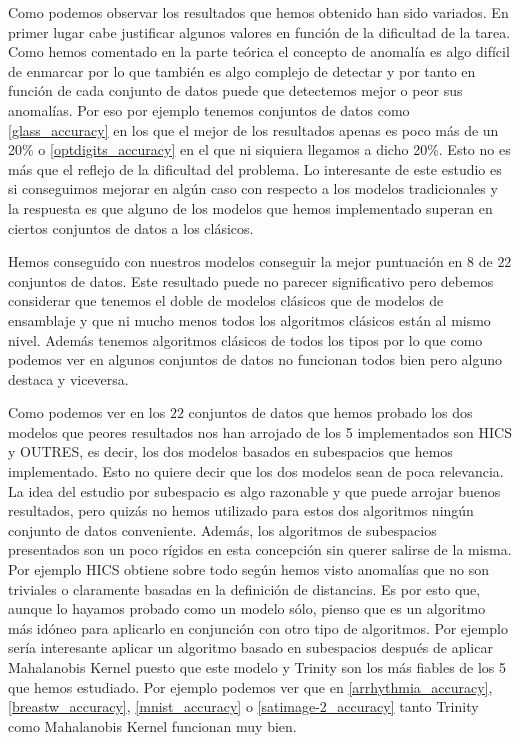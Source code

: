 Como podemos observar los resultados que hemos obtenido han sido variados. En primer lugar cabe justificar algunos valores en función de la dificultad de la tarea. Como hemos comentado en la parte teórica el concepto de anomalía es algo difícil de enmarcar por lo que también es algo complejo de detectar y por tanto en función de cada conjunto de datos puede que detectemos mejor o peor sus anomalías. Por eso por ejemplo tenemos conjuntos de datos como \ref{glass_accuracy} en los que el mejor de los resultados apenas es poco más de un 20\% o \ref{optdigits_accuracy} en el que ni siquiera llegamos a dicho 20\%. Esto no es más que el reflejo de la dificultad del problema. Lo interesante de este estudio es si conseguimos mejorar en algún caso con respecto a los modelos tradicionales y la respuesta es que alguno de los modelos que hemos implementado superan en ciertos conjuntos de datos a los clásicos.

Hemos conseguido con nuestros modelos conseguir la mejor puntuación en $8$ de $22$ conjuntos de datos. Este resultado puede no parecer significativo pero debemos considerar que tenemos el doble de modelos clásicos que de modelos de ensamblaje y que ni mucho menos todos los algoritmos clásicos están al mismo nivel. Además tenemos algoritmos clásicos de todos los tipos por lo que como podemos ver en algunos conjuntos de datos no funcionan todos bien pero alguno destaca y viceversa. 

Como podemos ver en los $22$ conjuntos de datos que hemos probado los dos modelos que peores resultados nos han arrojado de los 5 implementados son HICS y OUTRES, es decir, los dos modelos basados en subespacios que hemos implementado. Esto no quiere decir que los dos modelos sean de poca relevancia. La idea del estudio por subespacio es algo razonable y que puede arrojar buenos resultados, pero quizás no hemos utilizado para estos dos algoritmos ningún conjunto de datos conveniente. Además, los algoritmos de subespacios presentados son un poco rígidos en esta concepción sin querer salirse de la misma. Por ejemplo HICS obtiene sobre todo según hemos  visto anomalías que no son triviales o claramente basadas en la definición de distancias. Es por esto que, aunque lo hayamos probado como un modelo sólo, pienso que es un algoritmo más idóneo para aplicarlo en conjunción con otro tipo de algoritmos. Por ejemplo sería interesante aplicar un algoritmo basado en subespacios después de aplicar Mahalanobis Kernel puesto que este modelo y Trinity son los más fiables de los 5 que hemos estudiado. Por ejemplo podemos ver que en \ref{arrhythmia_accuracy}, \ref{breastw_accuracy}, \ref{mnist_accuracy} o \ref{satimage-2_accuracy} tanto Trinity como Mahalanobis Kernel funcionan muy bien. 

